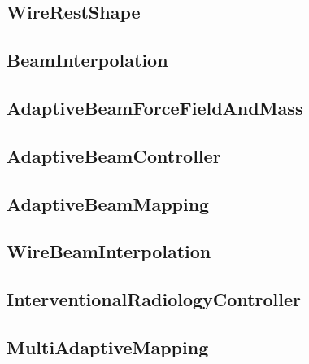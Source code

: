 \documentclass[a4paper,10pt]{article}
\begin{document}
\subsection{WireRestShape }
\subsection{BeamInterpolation }
\subsection{AdaptiveBeamForceFieldAndMass }
\subsection{AdaptiveBeamController }
\subsection{AdaptiveBeamMapping }
\subsection{WireBeamInterpolation }
\subsection{InterventionalRadiologyController }
\subsection{MultiAdaptiveMapping }


\end{document}
